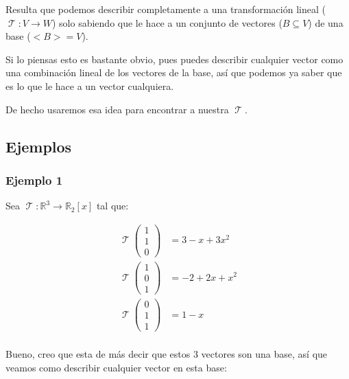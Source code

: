 \documentclass[12pt]{report}                                    %
\DeclareMathOperator \LinealTransformation {\mathcal{T}}        %
\DeclareMathOperator \LT {\mathcal{T}}                          %
\newcommand{\pVector}[1]{                                       %
        \ensuremath{\begin{pmatrix}#1\end{pmatrix}}                 %
    }
\begin{document}
        Resulta que podemos describir completamente a una transformación lineal ($\LT: V \to W$) solo
        sabiendo que le hace a un conjunto de vectores ($B \subseteq V$) de una base ($<B> = V$).

        Si lo piensas esto es bastante obvio, pues puedes describir cualquier vector como una 
        combinación lineal de los vectores de la base, así que podemos ya saber que es lo que
        le hace a un vector cualquiera.

        De hecho usaremos esa idea para encontrar a nuestra $\LT$.


        \clearpage
        \subsection{Ejemplos}


            \subsubsection{\large Ejemplo 1}
            Sea $\LinealTransformation : \mathbb{R}^3 \to \mathbb{R}_2[x]$ tal que: 

            \begin{equation*}
            \begin{split}
                \LinealTransformation \pVector{1\\1\\0} &= 3 - x + 3x^2          \\
                \LinealTransformation \pVector{1\\0\\1} &= -2 + 2x + x^2         \\
                \LinealTransformation \pVector{0\\1\\1} &= 1 - x                 \\
            \end{split}
            \end{equation*}

            Bueno, creo que esta de más decir que estos 3 vectores son una base, así que veamos como
            describir cualquier vector en esta base:
\end{document}
